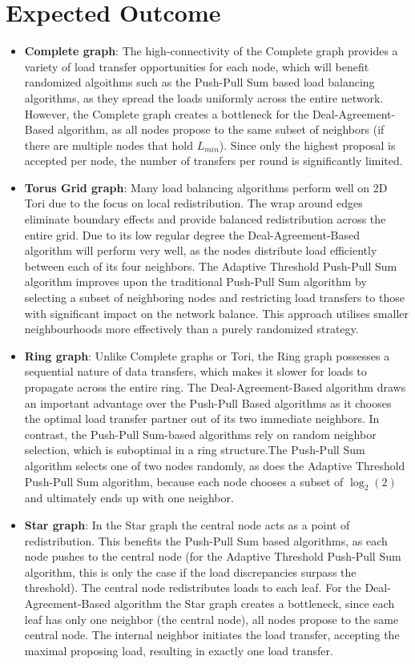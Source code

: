 \section{Expected Outcome}\label{sec:expectedoutcome}
\begin{itemize}
    \item \textbf{Complete graph}: The high-connectivity of the Complete graph provides a variety of load transfer opportunities for each node, which will benefit randomized algoithms such as the Push-Pull Sum based load balancing algorithms, as they spread the loads uniformly across the entire network. However, the Complete graph creates a bottleneck for the Deal-Agreement-Based algorithm, as all nodes propose to the same subset of neighbors (if there are multiple nodes that hold $L_{min}$). Since only the highest proposal is accepted per node, the number of transfers per round is significantly limited. 
    \item \textbf{Torus Grid graph}: Many load balancing algorithms perform well on 2D Tori due to the focus on local redistribution. The wrap around edges eliminate boundary effects and provide balanced redistribution across the entire grid. Due to its low regular degree the Deal-Agreement-Based algorithm will perform very well, as the nodes distribute load efficiently between each of its four neighbors. The Adaptive Threshold Push-Pull Sum algorithm improves upon the traditional Push-Pull Sum algorithm by selecting a subset of neighboring nodes and restricting load transfers to those with significant impact on the network balance. This approach utilises smaller neighbourhoods more effectively than a purely randomized strategy.
    \item  \textbf{Ring graph}: Unlike Complete graphs or Tori, the Ring graph possesses a sequential nature of data transfers, which makes it slower for loads to propagate across the entire ring. The Deal-Agreement-Based algorithm draws an important advantage over the Push-Pull Based algorithms as it chooses the optimal load transfer partner out of its two immediate neighbors. In contrast, the Push-Pull Sum-based algorithms rely on random neighbor selection, which is suboptimal in a ring structure.The Push-Pull Sum algorithm selects one of two nodes randomly, as does the Adaptive Threshold Push-Pull Sum algorithm, because each node chooses a subset of $\log_{2}{(2)}$ and ultimately ends up with one neighbor.
    \item \textbf{Star graph}: In the Star graph the central node acts as a point of redistribution. This benefits the Push-Pull Sum based algorithms, as each node pushes to the central node (for the Adaptive Threshold Push-Pull Sum algorithm, this is only the case if the load discrepancies surpass the threshold). The central node redistributes loads to each leaf. For the Deal-Agreement-Based algorithm the Star graph creates a bottleneck, since each leaf has only one neighbor (the central node), all nodes propose to the same central node. The internal neighbor initiates the load transfer, accepting the maximal proposing load, resulting in exactly one load transfer.

\end{itemize}
